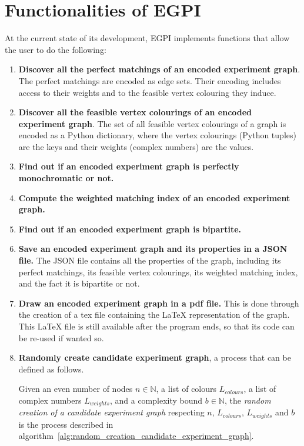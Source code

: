 \section{Functionalities of EGPI}
\label{sec:functionalities-of-egpi}

At the current state of its development, EGPI implements functions that allow the user to do the following:

\begin{enumerate}
    \item \textbf{Discover all the perfect matchings of an encoded experiment graph}.
        The perfect matchings are encoded as edge sets.
        Their encoding includes access to their weights and to the feasible vertex colouring they induce.
    \item \textbf{Discover all the feasible vertex colourings of an encoded experiment graph}.
        The set of all feasible vertex colourings of a graph is encoded as a Python dictionary, where the vertex colourings (Python tuples) are the keys and their weights (complex numbers) are the values.
    \item \textbf{Find out if an encoded experiment graph is perfectly monochromatic or not.}
    \item \textbf{Compute the weighted matching index of an encoded experiment graph.}
    \item \textbf{Find out if an encoded experiment graph is bipartite.}
    \item \textbf{Save an encoded experiment graph and its properties in a JSON file.}
        The JSON file contains all the properties of the graph, including its perfect matchings, its feasible vertex colourings, its weighted matching index, and the fact it is bipartite or not.
    \item \textbf{Draw an encoded experiment graph in a pdf file.}
        This is done through the creation of a tex file containing the LaTeX representation of the graph.
        This LaTeX file is still available after the program ends, so that its code can be re-used if wanted so.
    \item \textbf{Randomly create candidate experiment graph}, a process that can be defined as follows.
        \begin{definition}
            \label{def:random-creation-candidate-experiment-graph}
            Given an even number of nodes $n \in \mathbb{N}$, a list of colours $L_{colours}$, a list of complex numbers $L_{weights}$, and a complexity bound $b \in \mathbb{N}$, the \textit{random creation of a candidate experiment graph} respecting $n$, $L_{colours}$, $L_{weights}$ and $b$ is the process described in algorithm~\ref{alg:random_creation_candidate_experiment_graph}.


\end{definition}
\end{enumerate}
